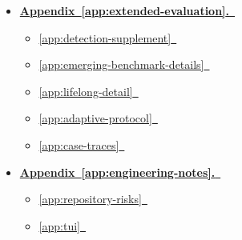 \begin{center}
\begin{tcolorbox}
\begin{itemize}[leftmargin=1.25em, itemsep=0.18em, parsep=0pt, topsep=0pt]
  \begin{itemize}[leftmargin=1.1em, itemsep=0.06em, parsep=0pt, topsep=0.06em]
    \item \hyperref[app:skill-inventory]{\ref*{app:skill-inventory}~}
    \item \hyperref[app:evolution-lineage]{\ref*{app:evolution-lineage}~}
    \item \hyperref[app:evolution-stats]{\ref*{app:evolution-stats}~}
  \end{itemize}
  \item \hyperref[app:extended-evaluation]{\textbf{Appendix~\ref*{app:extended-evaluation}.}~}
  \begin{itemize}[leftmargin=1.1em, itemsep=0.06em, parsep=0pt, topsep=0.06em]
    \item \hyperref[app:detection-supplement]{\ref*{app:detection-supplement}~}
    \item \hyperref[app:emerging-benchmark-details]{\ref*{app:emerging-benchmark-details}~}
    \item \hyperref[app:lifelong-detail]{\ref*{app:lifelong-detail}~}
    \item \hyperref[app:adaptive-protocol]{\ref*{app:adaptive-protocol}~}
    \item \hyperref[app:case-traces]{\ref*{app:case-traces}~}
  \end{itemize}
  \item \hyperref[app:engineering-notes]{\textbf{Appendix~\ref*{app:engineering-notes}.}~}
  \begin{itemize}[leftmargin=1.1em, itemsep=0.06em, parsep=0pt, topsep=0.06em]
    \item \hyperref[app:repository-risks]{\ref*{app:repository-risks}~}
    \item \hyperref[app:tui]{\ref*{app:tui}~}
  \end{itemize}
\end{itemize}
\end{tcolorbox}



\end{center}
